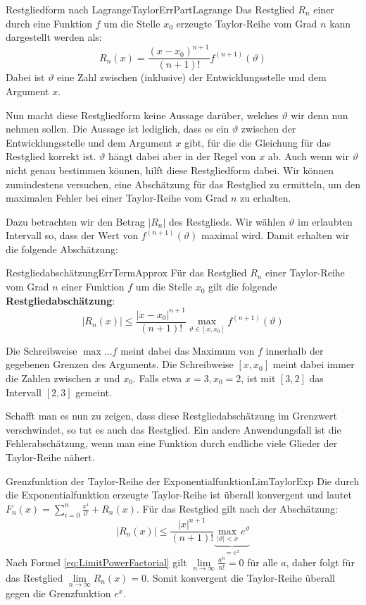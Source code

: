 \begin{statement}{Restgliedform nach Lagrange}{TaylorErrPartLagrange}
    Das Restglied $R_n$ einer durch eine Funktion $f$ um die Stelle $x_0$ erzeugte Taylor-Reihe vom Grad $n$ kann dargestellt werden als:
    $$
        R_n(x) = \frac{(x-x_0)^{n+1}}{(n+1)!} f^{(n+1)}(\vartheta)
    $$
    Dabei ist $\vartheta$ eine Zahl zwischen (inklusive) der Entwicklungsstelle und dem Argument $x$.
\end{statement}

Nun macht diese Restgliedform keine Aussage darüber, welches $\vartheta$ wir denn nun nehmen sollen. Die Aussage ist lediglich, dass es ein $\vartheta$ zwischen der Entwicklungsstelle und dem Argument $x$ gibt, für die die Gleichung für das Restglied korrekt ist. $\vartheta$ hängt dabei aber in der Regel von $x$ ab. Auch wenn wir $\vartheta$ nicht genau bestimmen können, hilft diese Restgliedform dabei. Wir können zumindestens versuchen, eine Abschätzung für das Restglied zu ermitteln, um den maximalen Fehler bei einer Taylor-Reihe vom Grad $n$ zu erhalten.

Dazu betrachten wir den Betrag $|R_n|$ des Restglieds. Wir wählen $\vartheta$ im erlaubten Intervall so, dass der Wert von $f^{(n+1)}(\vartheta)$ maximal wird. Damit erhalten wir die folgende Abschätzung:

\begin{statement}{Restgliedabschätzung}{ErrTermApprox}
    Für das Restglied $R_n$ einer Taylor-Reihe vom Grad $n$ einer Funktion $f$ um die Stelle $x_0$ gilt die folgende \textbf{Restgliedabschätzung}:
    $$
        |R_n(x)| \le \frac{|x-x_0|^{n+1}}{(n+1)!} \max\limits_{\vartheta \in [x,x_0]} f^{(n+1)}(\vartheta)
    $$
\end{statement}

Die Schreibweise $\max\limits{\dots} f$ meint dabei das Maximum von $f$ innerhalb der gegebenen Grenzen des Arguments. Die Schreibweise $[x, x_0]$ meint dabei immer die Zahlen zwischen $x$ und $x_0$. Falls etwa $x=3, x_0=2$, ist mit $[3,2]$ das Intervall $[2,3]$ gemeint.

Schafft man es nun zu zeigen, dass diese Restgliedabschätzung im Grenzwert verschwindet, so tut es auch das Restglied. Ein andere Anwendungsfall ist die Fehlerabschätzung, wenn man eine Funktion durch endliche viele Glieder der Taylor-Reihe nähert.

\begin{example}{Grenzfunktion der Taylor-Reihe der Exponentialfunktion}{LimTaylorExp}
    Die durch die Exponentialfunktion erzeugte Taylor-Reihe ist überall konvergent und lautet $F_n(x) = \sum\limits_{i=0}^n \frac{x^i}{i!} + R_n(x)$. Für das Restglied gilt nach der Abschätzung:
    $$
        |R_n(x)| \le  \frac{|x|^{n+1}}{(n+1)!} \underbrace{\max\limits_{|\vartheta| < x} e^{\vartheta}}_{=e^x}
    $$
    Nach Formel \ref{eq:LimitPowerFactorial} gilt $\lim\limits_{n\to\infty} \frac{a^n}{n!} = 0$ für alle $a$, daher folgt für das Restglied $\lim\limits_{n\to\infty} R_n(x) = 0$. Somit konvergent die Taylor-Reihe überall gegen die Grenzfunktion $e^x$.
\end{example}

